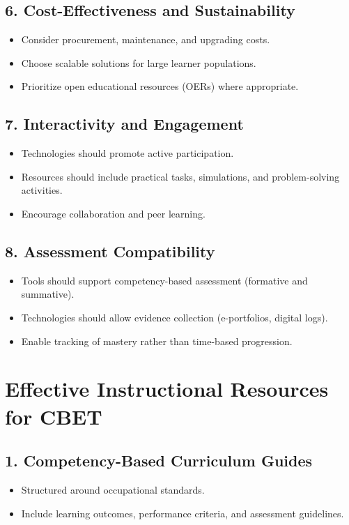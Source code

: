\documentclass[12pt,a4paper]{article}
\begin{document}
\subsection*{6. Cost-Effectiveness and Sustainability}
\begin{itemize}
    \item Consider procurement, maintenance, and upgrading costs.
    \item Choose scalable solutions for large learner populations.
    \item Prioritize open educational resources (OERs) where appropriate.
\end{itemize}

\subsection*{7. Interactivity and Engagement}
\begin{itemize}
    \item Technologies should promote active participation.
    \item Resources should include practical tasks, simulations, and problem-solving activities.
    \item Encourage collaboration and peer learning.
\end{itemize}

\subsection*{8. Assessment Compatibility}
\begin{itemize}
    \item Tools should support competency-based assessment (formative and summative).
    \item Technologies should allow evidence collection (e-portfolios, digital logs).
    \item Enable tracking of mastery rather than time-based progression.
\end{itemize}

\section*{Effective Instructional Resources for CBET}

\subsection*{1. Competency-Based Curriculum Guides}
\begin{itemize}
    \item Structured around occupational standards.
    \item Include learning outcomes, performance criteria, and assessment guidelines.
\end{itemize}
\end{document}
